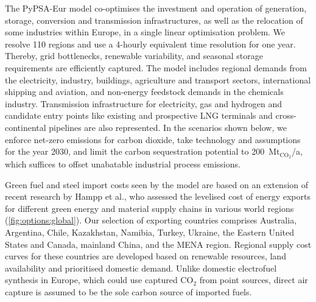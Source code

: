 The PyPSA-Eur\cite{PyPSAEurSecSectorCoupled} model co-optimises the investment
and operation of generation, storage, conversion and transmission
infrastructures, as well as the relocation of some industries within
Europe,\cite{verpoortEstimatingRenewables2023,samadiRenewablesPull2023} in a
single linear optimisation problem. We resolve 110 regions
and use a 4-hourly
equivalent time resolution for one year. Thereby, grid bottlenecks, renewable
variability, and seasonal storage requirements are efficiently captured.
The
model includes regional demands from the electricity, industry, buildings,
agriculture and transport sectors, international shipping and aviation, and
non-energy feedstock demands in the chemicals industry. Transmission
infrastructure for electricity, gas and hydrogen and candidate entry points like
existing and prospective LNG terminals and cross-continental pipelines are also
represented. In the scenarios shown below, we enforce net-zero emissions for
carbon dioxide, take technology and assumptions for the year 2030,\cite{dea2019}
and limit the carbon sequestration potential to 200~Mt$_{\text{CO}_2}$/a, which
suffices to offset unabatable industrial process emissions. 

Green fuel and steel import costs seen by the model are based on an extension of
recent research by Hampp et al.,\cite{hamppImportOptions2023} who assessed the
levelised cost of energy exports for different green energy and material supply
chains in various world regions (\cref{fig:options:global}). Our selection of
exporting countries comprises Australia, Argentina, Chile, Kazakhstan, Namibia,
Turkey, Ukraine, the Eastern United States and Canada, mainland China, and the
MENA region. Regional supply cost curves for these countries are developed based
on renewable resources, land availability and prioritised domestic demand.
Unlike domestic electrofuel synthesis in Europe, which could use captured CO$_2$
from point sources, direct air capture is assumed to be the sole carbon source
of imported fuels.

